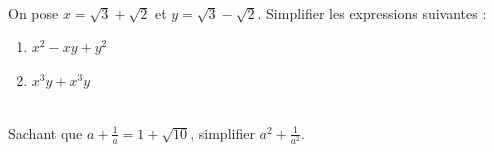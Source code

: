 \documentclass[main.tex]{subfiles}
\begin{document}
\begin{exercise} \hfill \\
	On pose $x=\sqrt{3}+\sqrt{2}$ et $y=\sqrt{3}-\sqrt{2}$. Simplifier les expressions suivantes :\hfill 
	\begin{enumerate}[label={\arabic*)},leftmargin=*] 
		\item  $x^2-xy+y^2$ 
		\item $x^3y+x^3y$ 
	\end{enumerate}  
\end{exercise}
\begin{exercise} \hfill \\
	Sachant que $a+\frac{1}{a}=1+\sqrt{10}$, simplifier $a^2+\frac{1}{a^2}$.
\end{exercise}
%	
\end{document}
